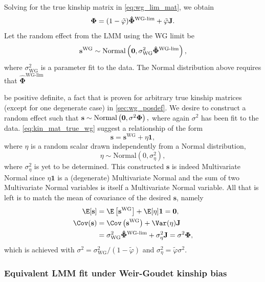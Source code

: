 \documentclass[11pt]{article}
\newcommand{\kinMat}{%
  \ensuremath{%
    \mathbf{\Phi}
  }%
  \xspace%
}%
\newcommand{\kinMatEstNamed}[1]{%
  \ensuremath{%
    \mathbf{\hat{\Phi}}^\text{#1}
  }%
  \xspace%
}%
\newcommand{\kinMatWGLim}{%
  \kinMatEstNamed{WG-lim}
}%
\begin{document}
Solving for the true kinship matrix in \cref{eq:wg_lim_mat}, we obtain
\begin{equation}
  \label{eq:kin_mat_true_wg}
  \kinMat = (1-\tilde{\varphi}) \kinMatWGLim + \tilde{\varphi} \mathbf{J}.
\end{equation}
Let the random effect from the LMM using the WG limit be
$$
\mathbf{s}^\text{WG} \sim \text{Normal} \left( \mathbf{0}, \sigma^2_\text{WG} \kinMatWGLim \right),
$$
where $\sigma^2_\text{WG}$ is a parameter fit to the data.
The Normal distribution above requires that \kinMatWGLim be positive definite, a fact that is proven for arbitrary true kinship matrices (except for one degenerate case) in \cref{sec:wg_posdef}.
We desire to construct a random effect such that 
$
\mathbf{s} \sim \text{Normal} \left( \mathbf{0}, \sigma^2 \kinMat \right),
$
where again $\sigma^2$ has been fit to the data.
\cref{eq:kin_mat_true_wg} suggest a relationship of the form
$$
\mathbf{s} = \mathbf{s}^\text{WG} + \eta \mathbf{1},
$$
where $\eta$ is a random scalar drawn independently from a Normal distribution,
$$
\eta \sim \text{Normal}( 0,\sigma_{\eta}^2),
$$
where $\sigma_{\eta}^2$ is yet to be determined.
This constructed $\mathbf{s}$ is indeed Multivariate Normal since $\eta \mathbf{1}$ is a (degenerate) Multivariate Normal and the sum of two Multivariate Normal variables is itself a Multivariate Normal variable.
All that is left is to match the mean of covariance of the desired $\mathbf{s}$, namely
\begin{align*}
  \E[ \mathbf{s} ]
  &=
    \E \left[ \mathbf{s}^\text{WG} \right] + \E [ \eta ] \mathbf{1}
    =
    \mathbf{0},
  \\
  \Cov( \mathbf{s} )
  &=
    \Cov \left( \mathbf{s}^\text{WG} \right) + \Var ( \eta ) \mathbf{J}
    \\
  &= 
    \sigma^2_\text{WG} \kinMatWGLim + \sigma_{\eta}^2 \mathbf{J}
    =
    \sigma^2 \kinMat
    ,
\end{align*}
which is achieved with $\sigma^2 = \sigma^2_\text{WG} / ( 1 - \tilde{\varphi} )$ and $\sigma_{\eta}^2 = \tilde{\varphi} \sigma^2$.

\subsubsection{Equivalent LMM fit under Weir-Goudet kinship bias}
\end{document}
